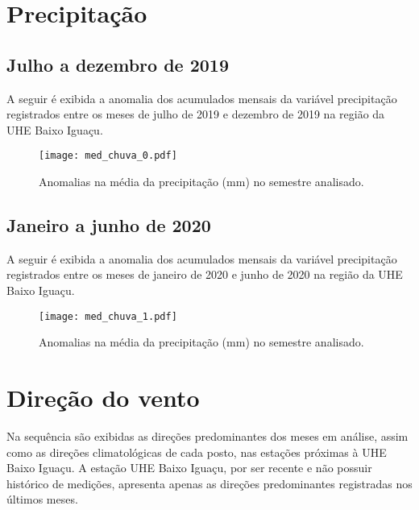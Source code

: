 \documentclass[a4paper,12pt]{article}
\begin{document}
        \newpage

        \section{Precipitação }
        \subsection{Julho a dezembro de 2019}
        \hspace{0.5cm} A seguir é exibida a anomalia dos acumulados mensais da variável precipitação registrados entre
        os meses de julho de 2019 e dezembro de 2019 na região da UHE Baixo Iguaçu.

        \begin{figure}[!htb]
        \centering
        \texttt{[image: med\_chuva\_0.pdf]}
        \caption{Anomalias na média da precipitação (mm) no semestre analisado.}
        \label{fig:figmed_chuva_0}
        \end{figure}

        \newpage
        \subsection{Janeiro a junho de 2020}
        \hspace{0.5cm} A seguir é exibida a anomalia dos acumulados mensais da variável precipitação registrados entre
        os meses de janeiro de 2020 e junho de 2020 na região da UHE Baixo Iguaçu.

        \begin{figure}[!htb]
        \centering
        \texttt{[image: med\_chuva\_1.pdf]}
        \caption{Anomalias na média da precipitação (mm) no semestre analisado.}
        \label{fig:figmed_chuva_1}
        \end{figure}

\newpage
\section{Direção do vento}

\hspace{0.5cm} Na sequência são exibidas as direções predominantes dos meses em análise, assim como as direções
climatológicas de cada posto, nas estações próximas à UHE Baixo Iguaçu. A estação UHE Baixo Iguaçu, por
ser recente e não possuir histórico de medições, apresenta apenas as direções predominantes registradas nos
últimos meses.
\end{document}
